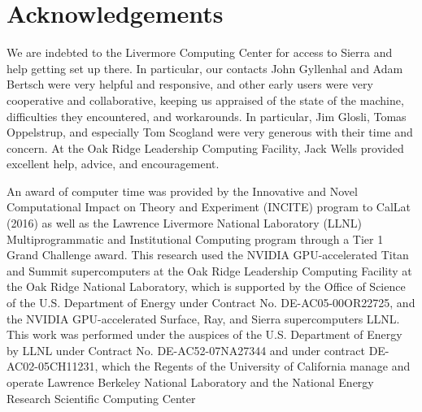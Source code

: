 \section{Acknowledgements}

We are indebted to the Livermore Computing Center for access to Sierra and help getting set up there.
In particular, our contacts John Gyllenhal and Adam Bertsch were very helpful and responsive, and other early users were very cooperative and collaborative, keeping us appraised of the state of the machine, difficulties they encountered, and workarounds.  In particular, Jim Glosli, Tomas Oppelstrup, and especially Tom Scogland were very generous with their time and concern.  At the Oak Ridge Leadership Computing Facility, Jack Wells provided excellent help, advice, and encouragement.

An award of computer time was provided by the Innovative and Novel Computational Impact on Theory and Experiment (INCITE) program to CalLat (2016) as well as the Lawrence Livermore National Laboratory (LLNL) Multiprogrammatic and Institutional Computing program through a Tier 1 Grand Challenge award. This research used the NVIDIA GPU-accelerated Titan and Summit supercomputers at the Oak Ridge Leadership Computing Facility at the Oak Ridge National Laboratory, which is supported by the Office of Science of the U.S. Department of Energy under Contract No. DE-AC05-00OR22725, and the NVIDIA GPU-accelerated Surface, Ray, and Sierra supercomputers LLNL.  This work was performed under the auspices of the U.S. Department of Energy by LLNL under Contract No. DE-AC52-07NA27344 and under contract DE-AC02-05CH11231, which the Regents of the University of California manage and operate Lawrence Berkeley National Laboratory and the National Energy Research Scientific Computing Center